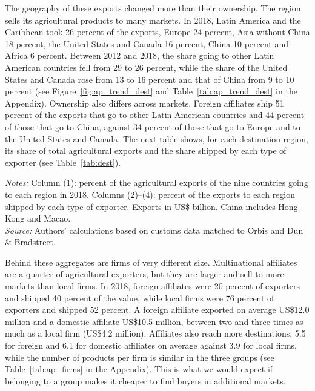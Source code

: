\documentclass[11pt,a4paper]{article}
\newcommand{\srcnote}{\textit{Source:} Authors' calculations based on customs data matched to Orbis and Dun \& Bradstreet.}
\begin{document}
The geography of these exports changed more than their ownership. The region sells its agricultural
products to many markets. In 2018, Latin America and the
Caribbean took 26 percent of the exports, Europe 24 percent, Asia without China 18 percent, the
United States and Canada 16 percent, China 10 percent and Africa 6 percent. Between 2012 and 2018,
the share going to other Latin American countries fell from 29 to 26 percent, while the share of
the United States and Canada rose from 13 to 16 percent and that of China from 9 to 10 percent (see
Figure~\ref{fig:ap_trend_dest} and Table~\ref{tab:ap_trend_dest} in the Appendix). Ownership also
differs across markets. Foreign affiliates ship 51 percent of the exports that go to other Latin
American countries and 44 percent of those that go to China, against 34 percent of those that go to
Europe and to the United States and Canada. The next table shows, for each destination region, its
share of total agricultural exports and the share shipped by each type of exporter (see
Table~\ref{tab:dest}).
\begin{table}[H]\centering\small%
  \caption{Agricultural Exports and Ownership, by Destination Region, 2018}%
  \label{tab:dest}%
  \par\vspace{3pt}%
  \begin{minipage}{0.95\textwidth}\footnotesize %
  \textit{Notes:} Column (1): percent of the agricultural exports of the nine countries going to each region in 2018. Columns (2)--(4): percent of the exports to each region shipped by each type of exporter. Exports in US\$ billion. China includes Hong Kong and Macao.\\[3pt]%
  \srcnote%
  \end{minipage}%
  \end{table}

Behind these aggregates are firms of very different size. Multinational affiliates are a quarter of
agricultural exporters, but they are larger and sell to more markets than local firms. In 2018,
foreign affiliates were 20 percent of exporters and shipped 40 percent of the value, while local
firms were 76 percent of exporters and shipped 52 percent. A foreign affiliate exported on average
US\$12.0 million and a domestic affiliate US\$10.5 million, between two and three times as much as a
local firm (US\$4.2 million). Affiliates also reach more destinations, 5.5 for foreign and 6.1 for
domestic affiliates on average against 3.9 for local firms, while the number of products per firm is
similar in the three groups (see Table~\ref{tab:ap_firms} in the Appendix). This is what we would
expect if belonging to a group makes it cheaper to find buyers in additional markets.
\end{document}
